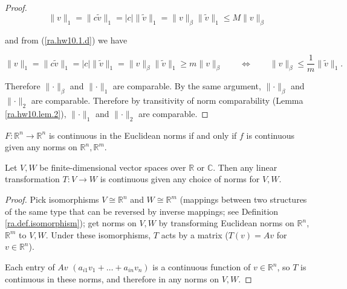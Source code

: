 \begin{proof}
\[
\lVert v \rVert_1 = \lVert c\tilde{v} \rVert_1 =  |c| \lVert  \tilde{v} \rVert_1 =  \lVert v \rVert_\beta \lVert  \tilde{v} \rVert_1 \leq M \lVert v \rVert_\beta
\]

and from (\ref{ra.hw10.1.d}) we have

\[
\lVert v \rVert_1 = \lVert c\tilde{v} \rVert_1 =  |c| \lVert  \tilde{v} \rVert_1 =  \lVert v \rVert_\beta \lVert  \tilde{v} \rVert_1 \geq m \lVert v \rVert_\beta \qquad \iff \qquad \lVert v \rVert_\beta \leq \frac{1}{m} \lVert  \tilde{v} \rVert_1 .
\]

Therefore \(\lVert \cdot \rVert_\beta\) and \(\lVert \cdot \rVert_1\) are comparable. By the same argument, \(\lVert \cdot \rVert_\beta\) and \(\lVert \cdot \rVert_2\) are comparable. Therefore by transitivity of norm comparability (Lemma \ref{ra.hw10.lem.2}), \(\lVert \cdot \rVert_1\) and \(\lVert \cdot \rVert_2\) are comparable.

\end{proof}

\begin{corollary}

\(F :\mathbb{R}^n \to \mathbb{R}^n\) is continuous in the Euclidean norms if and only if \(f\) is continuous given any norms on \(\mathbb{R}^n, \mathbb{R}^m\). 

\end{corollary}

\begin{corollary}

Let \(V, W\) be finite-dimensional vector spaces over \(\mathbb{R}\) or \(\mathbb{C}\). Then any linear transformation \(T: V \to W\) is continuous given any choice of norms for \(V, W\).

\end{corollary}

\begin{proof}

Pick isomorphisms \(V \cong \mathbb{R}^n\) and \(W \cong \mathbb{R}^m\) (mappings between two structures of the same type that can be reversed by inverse mappings; see Definition \ref{ra.def.isomorphism}); get norms on \(V, W\) by transforming Euclidean norms on \(\mathbb{R}^n\), \(\mathbb{R}^m\) to \(V, W\). Under these isomorphisms, \(T\) acts by a matrix (\(T(v) = Av \) for \(v \in \mathbb{R}^n\)). 

Each entry of \(A v\) \((a_{i1} v_1 + \ldots + a_{in} v_n)\) is a continuous function of \(v \in \mathbb{R}^n\), so \(T\) is continuous in these norms, and therefore in any norms on \(V, W\).



\end{proof}

